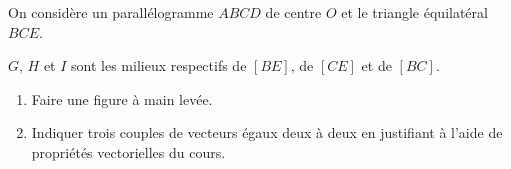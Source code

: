 \begin{exo}{}
	On considère un parallélogramme $ABCD$ de centre $O$ et le triangle équilatéral $BCE$.


	$G$, $H$ et $I$ sont les milieux respectifs de $[BE]$, de $[CE]$ et de $[BC]$.

	\begin{enumerate}
		\item Faire une figure à main levée.
		\item Indiquer trois couples de vecteurs égaux deux à deux en justifiant à l'aide de propriétés vectorielles du cours.
	\end{enumerate}
\end{exo}
